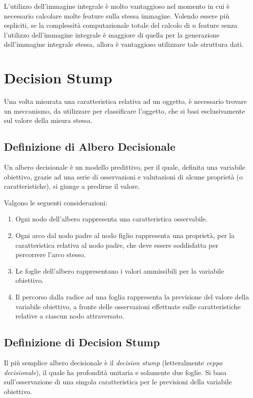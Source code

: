         L'utilizzo dell'immagine integrale è molto vantaggioso nel momento in cui è necessario calcolare molte feature sulla stessa immagine.
        Volendo essere più espliciti, se la complessità computazionale totale del calcolo di $n$ feature senza l'utilizzo dell'immagine integrale è maggiore di quella per la generazione dell'immagine integrale stessa, allora è vantaggioso utilizzare tale struttura dati.

    \section{Decision Stump}
    \label{sec:decision_stump}
        Una volta misurata una caratteristica relativa ad un oggetto, è necessario trovare un meccanismo, da utilizzare per classificare l'oggetto, che si basi esclusivamente sul valore della misura stessa.        

        \subsection{Definizione di Albero Decisionale}
        Un albero decisionale è un modello predittivo, per il quale, definita una variabile obiettivo, grazie ad una serie di osservazioni e valutazioni di alcune proprietà (o caratteristiche), si giunge a predirne il valore.

        Valgono le seguenti considerazioni:
        \begin{enumerate}
            \item Ogni nodo dell'albero rappresenta una caratteristica osservabile.
            \item Ogni arco dal nodo padre al nodo figlio rappresenta una proprietà, per la caratteristica relativa al nodo padre, che deve essere soddisfatta per percorrere l'arco stesso.
            \item Le foglie dell'albero rappresentano i valori ammissibili per la variabile obiettivo.
            \item Il percorso dalla radice ad una foglia rappresenta la previsione del valore della variabile obiettivo, a fronte delle osservazioni effettuate sulle caratteristiche relative a ciascun nodo attraversato.
        \end{enumerate}

        \subsection{Definizione di Decision Stump}
            Il più semplice albero decisionale è il \emph{decision stump} (letteralmente \emph{ceppo decisionale}), il quale ha profondità unitaria e solamente due foglie.
            Si basa sull'osservazione di una singola caratteristica per le previsioni della variabile obiettivo.

